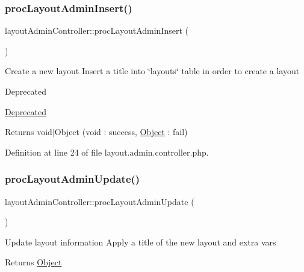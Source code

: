 \mbox{\label{classlayoutAdminController_aa80e244c2f02d0c46c6bee2f5921f4aa}} 
\subsubsection{\texorpdfstring{proc\+Layout\+Admin\+Insert()}{procLayoutAdminInsert()}}
{\footnotesize\ttfamily layout\+Admin\+Controller\+::proc\+Layout\+Admin\+Insert (\begin{DoxyParamCaption}{ }\end{DoxyParamCaption})}

Create a new layout Insert a title into \char`\"{}layouts\char`\"{} table in order to create a layout \begin{DoxyRefDesc}{Deprecated}
\item[\hyperlink{deprecated__deprecated000015}{Deprecated}]\end{DoxyRefDesc}
\begin{DoxyReturn}{Returns}
void$\vert$\+Object (void \+: success, \hyperlink{classObject}{Object} \+: fail) 
\end{DoxyReturn}


Definition at line 24 of file layout.\+admin.\+controller.\+php.

\mbox{\label{classlayoutAdminController_a897057011913af6cb2740d8460544119}} 
\subsubsection{\texorpdfstring{proc\+Layout\+Admin\+Update()}{procLayoutAdminUpdate()}}
{\footnotesize\ttfamily layout\+Admin\+Controller\+::proc\+Layout\+Admin\+Update (\begin{DoxyParamCaption}{ }\end{DoxyParamCaption})}

Update layout information Apply a title of the new layout and extra vars \begin{DoxyReturn}{Returns}
\hyperlink{classObject}{Object} 
\end{DoxyReturn}


